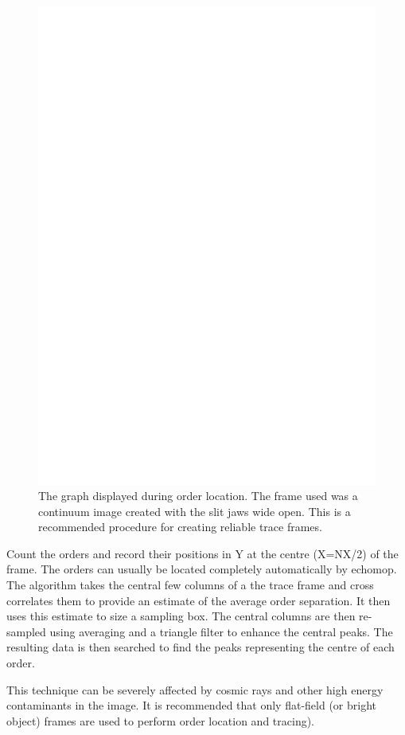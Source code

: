 \documentclass[11pt,twoside]{article}
\newcommand{\sunspec}[2]{#1}
\renewcommand{\sunspec}[2]{#2}
\newcommand{\myindex}[1]{\index{#1}}
\renewcommand{\myindex}[1]{}
\begin{document}
\begin{itemize}
\begin{figure}
\begin{center}
\includegraphics[width=\textwidth]{sun152_01.eps}

\parbox{140mm}{
\caption{The graph displayed during order location.  The frame used
was a continuum image created with the slit jaws wide open.  This is
a recommended procedure for creating reliable trace frames.}
\label{fi_locate}
}
\end{center}
\end{figure}

Count the orders and record their positions in Y at the centre (X=NX/2)
of the frame.
The orders can usually be located completely automatically by
{\sc echomop.} The algorithm takes the central few columns of a the trace
frame and cross correlates them to provide an estimate of the average
order separation. It then uses this estimate to size a sampling box.
The central columns are then re-sampled using averaging and a
triangle filter to enhance the central peaks. The resulting data is
then searched to find the peaks representing the centre of each
order.
\myindex{Cosmic rays!order location}
This technique can be severely affected by cosmic rays and other high
energy contaminants in the image. It is recommended that only
flat-field (or bright object) frames are used to perform order location
and tracing).


\end{itemize}
\end{document}
